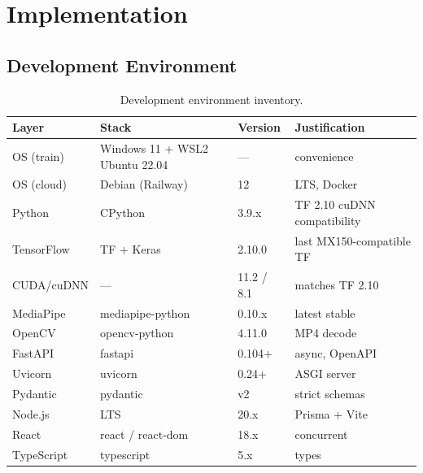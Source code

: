 \chapter{Implementation}
\label{ch:implementation}

\section{Development Environment}
\label{sec:impl:env}

\begin{table}[H]\centering
  \caption{Development environment inventory.}\label{tab:env}
  \begin{tabularx}{\textwidth}{l X l X}\toprule
    Layer       & Stack                                  & Version & Justification \\\midrule
    OS (train)  & Windows 11 + WSL2 Ubuntu 22.04         & ---     & convenience \\
    OS (cloud)  & Debian (Railway)                       & 12      & LTS, Docker \\
    Python      & CPython                                & 3.9.x   & TF 2.10 cuDNN compatibility \\
    TensorFlow  & TF + Keras                             & 2.10.0  & last MX150-compatible TF \\
    CUDA/cuDNN  & ---                                     & 11.2 / 8.1 & matches TF 2.10 \\
    MediaPipe   & mediapipe-python                       & 0.10.x  & latest stable \\
    OpenCV      & opencv-python                          & 4.11.0  & MP4 decode \\
    FastAPI     & fastapi                                & 0.104+  & async, OpenAPI \\
    Uvicorn     & uvicorn                                & 0.24+   & ASGI server \\
    Pydantic    & pydantic                               & v2      & strict schemas \\
    Node.js     & LTS                                    & 20.x    & Prisma + Vite \\
    React       & react / react-dom                      & 18.x    & concurrent \\
    TypeScript  & typescript                             & 5.x     & types \\

\end{tabularx}
\end{table}
